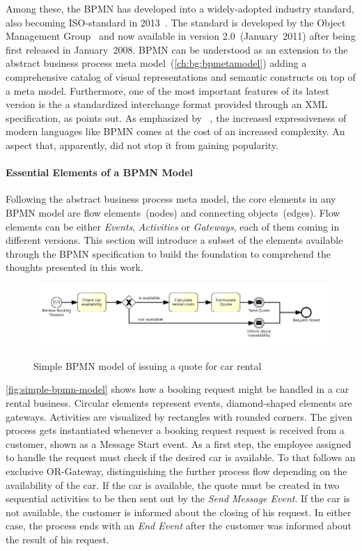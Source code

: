 Among these, the \acs{BPMN} has developed into a widely-adopted industry standard, also becoming ISO-standard in 2013~\cite{iso2013bpmn}.
The standard is developed by the Object Management Group~\cite{omghome} and now available in version 2.0~(January~2011) after being first released in January~2008.
\acs{BPMN} can be understood as an extension to the abstract business process meta model~(\autoref{ch:bg:bpmetamodel}) adding a comprehensive catalog of visual representations and semantic constructs on top of a meta model. Furthermore, one of the most important features of its latest version is the a standardized interchange format provided through an \acs{XML} specification, as \cite{weske:bpm-book} points out.
As emphasized by \citeauthor{Muehlen:2007}~\cite{Muehlen:2007}, the increased expressiveness of modern languages like \acs{BPMN} comes at the cost of an increased complexity. An aspect that, apparently, did not stop it from gaining popularity.

\paragraph{Essential Elements of a BPMN Model}
Following the abstract business process meta model, the core elements in any BPMN model are flow elements~(nodes) and connecting objects~(edges).
Flow elements can be either \textit{Events}, \textit{Activities} or \textit{Gateways}, each of them coming in different versions.
This section will introduce a subset of the elements available through the \acs{BPMN} specification to build the foundation to comprehend the thoughts presented in this work.

\begin{figure}[]
	\myfloatalign
	{\includegraphics[width=1\linewidth]{chapters/background/intro-rental-car.png}}
	\caption{Simple BPMN model of issuing a quote for car rental}
	\label{fig:simple-bpmn-model}
\end{figure}

\autoref{fig:simple-bpmn-model} shows how a booking request might be handled in a car rental business.
Circular elements represent events, diamond-shaped elements are gateways. Activities are visualized by rectangles with rounded corners.
The given process gets instantiated whenever a booking request request is received from a customer, shown as a Message Start event. 
As a first step, the employee assigned to handle the request must check if the desired car is available. To that follows an exclusive OR-Gateway, distinguishing the further process flow depending on the availability of the car.
If the car is available, the quote must be created in two sequential activities to be then sent out by the \textit{Send Message Event}. If the car is not available, the customer is informed about the closing of his request. 
In either case, the process ends with an \textit{End Event} after the customer was informed about the result of his request.

